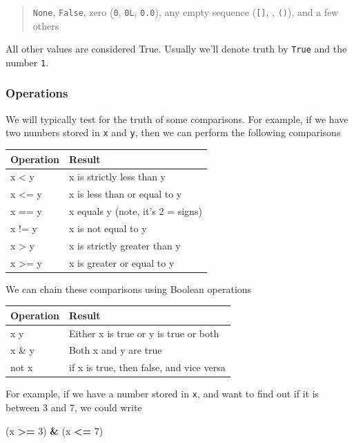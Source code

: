 \documentclass[
  letterpaper,
]{scrbook}
\newenvironment{Shaded}{\begin{snugshade}}{\end{snugshade}}
\newcommand{\DecValTok}[1]{\textcolor[rgb]{0.00,0.00,0.81}{#1}}
\newcommand{\NormalTok}[1]{#1}
\newcommand{\OperatorTok}[1]{\textcolor[rgb]{0.81,0.36,0.00}{\textbf{#1}}}
\begin{document}
\begin{quote}
\texttt{None}, \texttt{False}, zero (\texttt{0}, \texttt{0L}, \texttt{0.0}), any empty sequence (\texttt{{[}{]}}, \texttt{\textquotesingle{}\textquotesingle{}}, \texttt{()}), and a few others
\end{quote}

All other values are considered True. Usually we'll denote truth by \texttt{True} and the number \texttt{1}.

\hypertarget{operations-1}{%
\subsubsection{Operations}\label{operations-1}}

We will typically test for the truth of some comparisons. For example, if we have two numbers stored in \texttt{x} and \texttt{y}, then we can perform the following comparisons

\begin{longtable}[]{@{}ll@{}}
\toprule
Operation & Result\tabularnewline
\midrule
\endhead
x \textless{} y & x is strictly less than y\tabularnewline
x \textless= y & x is less than or equal to y\tabularnewline
x == y & x equals y (note, it's 2 = signs)\tabularnewline
x != y & x is not equal to y\tabularnewline
x \textgreater{} y & x is strictly greater than y\tabularnewline
x \textgreater= y & x is greater or equal to y\tabularnewline
\bottomrule
\end{longtable}

We can chain these comparisons using Boolean operations

\begin{longtable}[]{@{}ll@{}}
\toprule
Operation & Result\tabularnewline
\midrule
\endhead
x \textbar{} y & Either x is true or y is true or both\tabularnewline
x \& y & Both x and y are true\tabularnewline
not x & if x is true, then false, and vice versa\tabularnewline
\bottomrule
\end{longtable}

For example, if we have a number stored in \texttt{x}, and want to find out if it is between 3 and 7, we could write

\begin{Shaded}
\begin{Highlighting}[]
\NormalTok{(x }\OperatorTok{\textgreater{}=} \DecValTok{3}\NormalTok{) }\OperatorTok{\&}\NormalTok{ (x }\OperatorTok{\textless{}=} \DecValTok{7}\NormalTok{)}
\end{Highlighting}
\end{Shaded}
\end{document}
